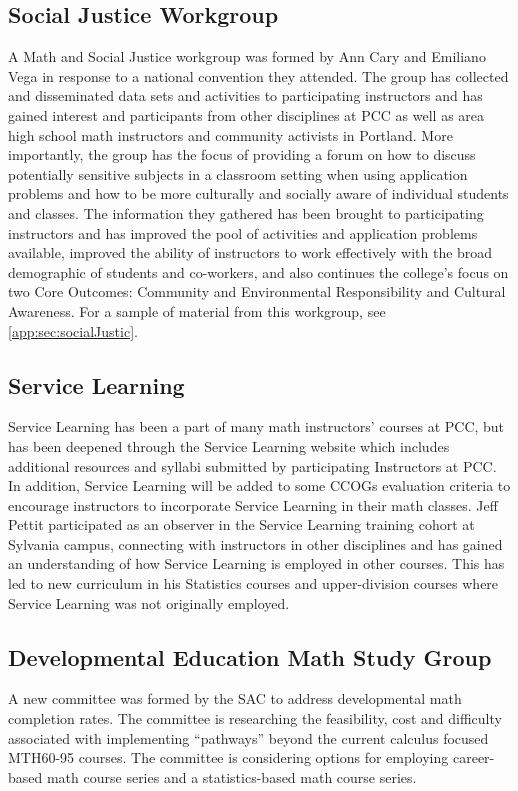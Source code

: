 \subsection{Social Justice Workgroup}\label{cur:sub:socialJustic}
A Math and Social Justice workgroup was formed by Ann Cary and Emiliano Vega in
response to a national convention they attended. The group has collected and
disseminated data sets and activities to participating instructors and has
gained interest and participants from other disciplines at PCC as well as area
high school math instructors and community activists in Portland. More
importantly, the group has the focus of providing a forum on how to discuss
potentially sensitive subjects in a classroom setting when using application
problems and how to be more culturally and socially aware of individual students
and classes. The information they gathered has been brought to participating
instructors and has improved the pool of activities and application problems
available, improved the ability of instructors to work effectively with the
broad demographic of students and co-workers, and also continues the college's
focus on two Core Outcomes: Community and Environmental Responsibility and
Cultural Awareness. For a sample of material from this workgroup, see
\vref{app:sec:socialJustic}.

\subsection{Service Learning}\label{other:sec:servicelearning}
Service Learning has been a part of many math instructors' courses at PCC, but
has been deepened through the Service Learning website
which includes additional resources and syllabi submitted
by participating Instructors at PCC. In addition, Service Learning will be
added to some CCOGs evaluation criteria to encourage instructors to incorporate
Service Learning in their math classes. Jeff Pettit participated as
an observer in the Service Learning training cohort at Sylvania campus,
connecting with instructors in other disciplines and has gained an understanding of 
how Service Learning is employed in other courses. This has led to new curriculum in his
Statistics courses and upper-division courses where Service Learning was not
originally employed.

\subsection{Developmental Education Math Study Group}
A new committee was formed by the SAC to address developmental math completion
rates. The committee is researching the feasibility, cost and difficulty
associated with implementing ``pathways'' beyond the current calculus focused
MTH60-95 courses. The committee is considering options for employing
career-based math course series and a statistics-based math course series.


